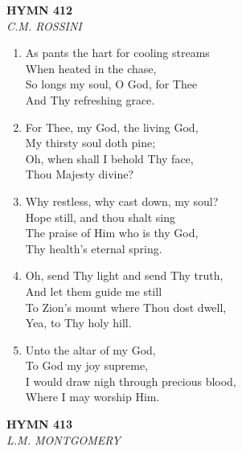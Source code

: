 \newpage
\begin{center}
    {\Large \textbf{HYMN 412}}
    \\
    \textit{C.M. ROSSINI}
\end{center}
\vspace{1em}

\begin{enumerate}
    \item As pants the hart for cooling streams \\
        When heated in the chase, \\
        So longs my soul, O God, for Thee \\
        And Thy refreshing grace.

    \item For Thee, my God, the living God, \\
        My thirsty soul doth pine; \\
        Oh, when shall I behold Thy face, \\
        Thou Majesty divine?

    \item Why restless, why cast down, my soul? \\
        Hope still, and thou shalt sing \\
        The praise of Him who is thy God, \\
        Thy health's eternal spring.

    \item Oh, send Thy light and send Thy truth, \\
        And let them guide me still \\
        To Zion's mount where Thou dost dwell, \\
        Yea, to Thy holy hill.

    \item Unto the altar of my God, \\
        To God my joy supreme, \\
        I would draw nigh through precious blood, \\
        Where I may worship Him.

\end{enumerate}

\newpage
\begin{center}
    {\Large \textbf{HYMN 413}}
    \\
    \textit{L.M. MONTGOMERY}
\end{center}
\vspace{1em}

